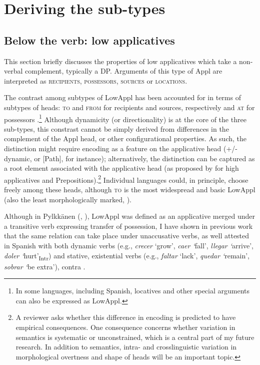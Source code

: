 \documentclass[output=paper,colorlinks,citecolor=brown,nonflat]{./langscibook}
\begin{document}
\section{Deriving the sub-types}\label{sec:cuervo:4}

\subsection{Below the verb: low applicatives}\label{sec:cuervo:4.1}

This section briefly discusses the properties of low applicatives which take a non-verbal complement, typically a DP. Arguments of this type of Appl are interpreted as \textsc{recipients}, \textsc{possessors}, \textsc{sources} or \textsc{locations}. 

The contrast among subtypes of LowAppl has been accounted for in terms of subtypes of heads: \textsc{to} and \textsc{from} for recipients and sources, respectively \citep{Pylkkänen2008} and \textsc{at} for possessors \citep{Cuervo2003}.\footnote{In some languages, including Spanish, locatives and other special arguments can also be expressed as LowAppl.} Although dynamicity (or directionality) is at the core of the three sub-types, this constrast cannot be simply derived from differences in the complement of the Appl head, or other configurational properties.  As such, the distinction might require encoding as a feature on the applicative head (+/- dynamic, or [Path], for instance); alternatively, the distinction can be captured as a root element associated with the applicative head (as proposed by \citealt{WoodMarantz2017} for high applicatives and Prepositions).\footnote{A reviewer asks whether this difference in encoding is predicted to have empirical consequences. One consequence concerns whether variation in semantics is systematic or unconstrained, which is a central part of my future research. In addition to semantics, intra- and crosslinguistic variation in morphological overtness and shape of heads will be an important topic.} Individual languages could, in principle, choose freely among these heads, although \textsc{to} is the most widespread and basic LowAppl (also the least morphologically marked, \citealt{Cuervo2015Chapter}).

Although in Pylkkänen (\citeyear{Pylkkänen2002}, \citeyear{Pylkkänen2008}), LowAppl was defined as an applicative merged under a transitive verb expressing transfer of possession, I have shown in previous work that the same relation can take place under unaccusative verbs, as well attested in Spanish with both dynamic verbs (e.g., \textit{crecer} ‘grow’, \textit{caer ‘}fall’, \textit{llegar ‘}arrive’, \textit{doler ‘}hurt’\textsubscript{Intr}) and stative, existential verbs (e.g., \textit{faltar} ‘lack’, \textit{quedar ‘}remain’, \textit{sobrar ‘}be extra’), contra \citet{Baker1996}. 
\end{document}

